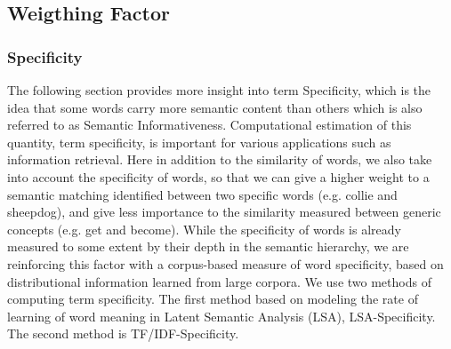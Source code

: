 \subsection{Weigthing Factor}
\subsubsection {Specificity}
The following section provides more insight into term Specificity, which is the idea that some words carry more semantic content than others which is also referred to as Semantic Informativeness. Computational estimation of this quantity, term specificity, is important for various applications such as information retrieval. Here in addition to the similarity of words, we also take into account the specificity of words, so that we can give a higher weight to a semantic matching identified between two specific words (e.g. collie and sheepdog), and give less importance to the similarity measured between generic concepts (e.g. get and become). While the specificity of words is already measured to some extent by their depth in the semantic hierarchy, we are reinforcing this factor with a corpus-based measure of word specificity, based on distributional information learned from large corpora.
We use two methods of computing term specificity. The first method based on modeling the rate of learning of word meaning in Latent Semantic Analysis (LSA), LSA-Specificity. The second method is TF/IDF-Specificity.

